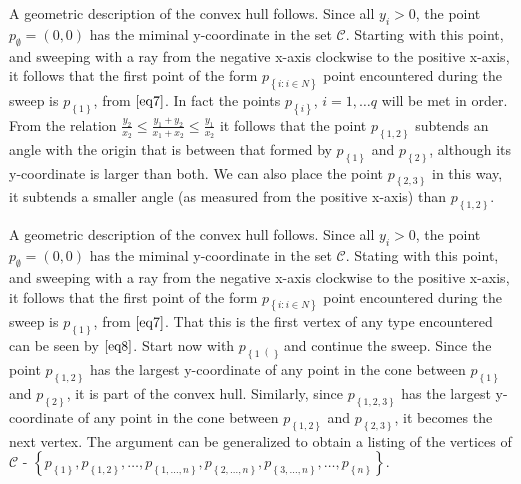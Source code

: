 \documentclass{article}
\theoremstyle{case}
\begin{document}
A geometric description of the convex hull follows. Since all $y_i > 0$, the point $p_{\emptyset} = \left(0,0\right)$ has the miminal y-coordinate in the set $\mathcal{C}$. Starting with this point, and sweeping with a ray from the negative x-axis clockwise to the positive x-axis, it follows that the first point of the form $p_{\left\lbrace i \colon i \in N\right\rbrace}$ point encountered during the sweep is $p_{\left\lbrace 1 \right\rbrace}$, from $\ref{eq7}$. In fact the points $p_{\left\lbrace i \right\rbrace}$, $i =1, \dots q$ will be met in order. From the relation $\frac{y_2}{x_2} \leq \frac{y_1+y_2}{x_1+x_2} \leq \frac{y_1}{x_2}$ it follows that the point $p_{\left\lbrace 1,2 \right\rbrace}$ subtends an angle with the origin that is between that formed by $p_{\left\lbrace 1 \right\rbrace}$ and $p_{\left\lbrace 2 \right\rbrace}$, although its y-coordinate is larger than both. We can also place the point $p_{\left\lbrace 2,3 \right\rbrace}$ in this way, it subtends a smaller angle (as measured from the positive x-axis) than $p_{\left\lbrace 1,2 \right\rbrace}$. 

A geometric description of the convex hull follows. Since all $y_i > 0$, the point $p_{\emptyset} = \left(0,0\right)$ has the miminal y-coordinate in the set $\mathcal{C}$. Stating with this point, and sweeping with a ray from the negative x-axis clockwise to the positive x-axis, it follows that the first point of the form $p_{\left\lbrace i \colon i \in N\right\rbrace}$ point encountered during the sweep is $p_{\left\lbrace 1 \right\rbrace}$, from $\ref{eq7}$. That this is the first vertex of any type encountered can be seen by $\ref{eq8}$. Start now with $p_{\left\lbrace 1\right(\rbrace}$ and continue the sweep. Since the point $p_{\left\lbrace 1,2 \right\rbrace}$ has the largest y-coordinate of any point in the cone between $p_{\left\lbrace 1 \right\rbrace}$ and $p_{\left\lbrace 2 \right\rbrace}$, it is part of the convex hull. Similarly, since $p_{\left\lbrace 1,2,3 \right\rbrace}$ has the largest y-coordinate of any point in the cone between $p_{\left\lbrace 1,2 \right\rbrace}$ and $p_{\left\lbrace 2,3 \right\rbrace}$, it becomes the next vertex. The argument can be generalized to obtain a listing of the vertices of $\mathcal{C}$ - $\left\lbrace p_{\left\lbrace 1\right\rbrace}, p_{\left\lbrace 1,2 \right\rbrace}, \dots, p_{\left\lbrace 1, \dots, n\right\rbrace}, p_{\left\lbrace 2, \dots, n\right\rbrace}, p_{\left\lbrace 3, \dots, n\right\rbrace}, \dots, p_{\left\lbrace n\right\rbrace}\right\rbrace$. 
\end{document}
